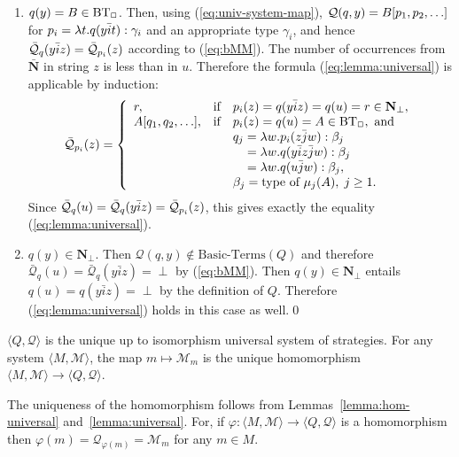 \documentclass[fleqn]{LMCS}
\theoremstyle{plain}\newtheorem{satz}[thm]{Satz}
\theoremstyle{plain}\newtheorem{hyp}[thm]{Hypothesis}
\theoremstyle{plain}\newtheorem{hyps}[thm]{Hypotheses}
\theoremstyle{definition}\newtheorem{note}[thm]{Note}
\newcommand{\arr}{\rightarrow}
\newcommand{\la}{\langle}
\newcommand{\ra}{\rangle}
\newcommand{\tuple}[1]{\la #1 \ra}
\newcommand{\NN}{\mathbf{N}}
\newcommand{\bNN}{\bar{\NN}}
\newcommand{\bQQ}{\bar{\QQ}}
\newcommand{\Undef}{{\perp}}
\newcommand{\MM}{{\mathcal M}}
\newcommand{\bj}{\bar{j}}
\newcommand{\bi}{\bar{i}}
\newcommand{\QQ}{{\mathcal Q}}
\newcommand{\?}{\mbox{?}}
\begin{document}
\begin{enumerate}[(1)]
\item
$q(y)=B\in\mbox{BT}_\Box$. Then, using (\ref{eq:univ-system-map}), 
$\QQ(q,y)=B[\pp_1,\pp_2,\ldots]$ 
for $\pp_i=\lambda t.q(y\bi t):\gamma_i$ and an appropriate type $\gamma_i$,
and hence $\bQQ_q(y\bi z)=\bQQ_{\pp_i}(z)$ 
according to (\ref{eq:bMM}). 
The number of occurrences from $\bNN$ in string $z$ is less than in $u$. 
Therefore the formula (\ref{eq:lemma:universal}) is applicable by induction:
\begin{equation}\nonumber
\bQQ_{\pp_i}(z)=\left\{
                 \begin{array}{lll}
                 r,              & \textrm{if} & \pp_i(z)=q(y\bi z)=q(u)=r\in\NN_\Undef,\\
                 A[q_1,q_2,\ldots],& \textrm{if} & 
                                                  \pp_i(z)=q(u)=A\in\BT,\textrm{ and} \\
                                 &              & 
q_j=\lambda w.\pp_i(z\bj w):\beta_j \\
                                 &              & 
\hspace{1.15em}   =\lambda w.q(y\bi z\bj w):\beta_j \\
                                 &              & 
\hspace{1.15em}   =\lambda w.q(u\bj w):\beta_j, \\
                                 &              & 
\beta_j=\textrm{type of }\mu_j(A),\; j\ge1.
                 \end{array}
           \right.
\end{equation}
Since $\bQQ_{q}(u)=\bQQ_q(y\bi z)=\bQQ_{\pp_i}(z)$, this gives exactly the equality 
(\ref{eq:lemma:universal}). 

\smallskip

\item
$q(y)\in\NN_\Undef$. Then $\QQ(q,y)\not\in\textrm{Basic-Terms}(Q)$ and therefore 
$\bQQ_q(u)=\bQQ_q(y\bi z)=\Undef$ by (\ref{eq:bMM}). Then $q(y)\in\NN_\Undef$ 
entails $q(u)=q(y\bi z)=\Undef$ by the definition of $Q$. Therefore 
(\ref{eq:lemma:universal}) holds in this case as well.\qed
\end{enumerate}
\begin{thm}\label{th:universal-system}
$\tuple{Q,\QQ}$ is the unique up to isomorphism universal system of strategies. 
For any system $\tuple{M,\MM}$, the map $m\mapsto\MM_m$ is the unique 
homomorphism $\tuple{M,\MM}\arr\tuple{Q,\QQ}$.
\end{thm}
\proof
The uniqueness of the homomorphism follows from Lemmas~\ref{lemma:hom-universal} 
and~\ref{lemma:universal}. 
For, if $\varphi:\tuple{M,\MM}\arr\tuple{Q,\QQ}$ is a homomorphism then 
$
\varphi(m)=\QQ_{\varphi(m)}=\MM_m
$
for any $m\in M$. 
\end{document}
